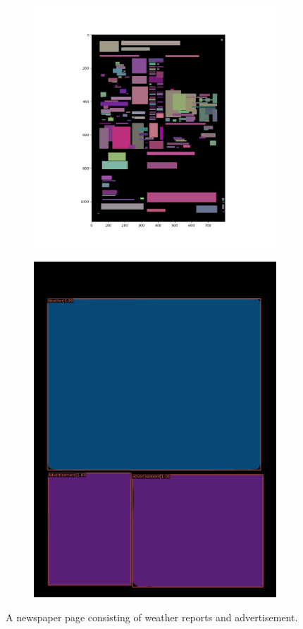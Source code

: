\documentclass[aspectratio=1610]{beamer}
\begin{document}
\begin{frame}
  \begin{figure}
\centering
\begin{subfigure}{.5\textwidth}
  \centering
  \includegraphics[width=0.7\linewidth, clip=true, trim = 50mm 20mm 60mm 0mm]{figures/tf/Jd55Bvg.png}
\end{subfigure}%
\begin{subfigure}{.5\textwidth}
  \centering
  \includegraphics[width=0.7\linewidth, clip=true, trim = 0mm 0mm 0mm 0mm]{figures/labels-vanilla-0.75/Jd55Bvg.jpg}
\end{subfigure}
\caption{A newspaper page consisting of weather reports and advertisement.}
\label{fig:weather}
\end{figure}
\end{frame}
\normalpage
\end{document}
